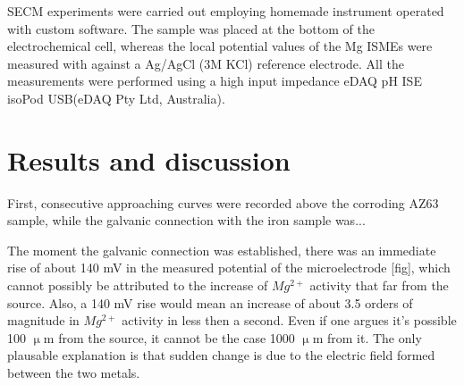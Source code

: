 \documentclass[3p]{elsarticle}
\begin{document}
SECM experiments were carried out employing homemade instrument operated with custom software. The sample was placed at the bottom of the electrochemical cell, whereas the local potential values of the Mg ISMEs were measured with against a Ag/AgCl (3M KCl) reference electrode. All the measurements were performed using a high input impedance eDAQ pH ISE isoPod USB(eDAQ Pty Ltd, Australia).

\section{Results and discussion}

First, consecutive approaching curves were recorded above the corroding AZ63 sample, while the galvanic connection with the iron sample was...

The moment the galvanic connection was established, there was an immediate rise of about 140 mV in the measured potential of the microelectrode [fig], which cannot possibly be attributed to the increase of $Mg^{2+}$ activity that far from the source. Also, a 140 mV rise would mean an increase of about 3.5 orders of magnitude in $Mg^{2+}$ activity in less then a second. Even if one argues it's possible 100 $\upmu$m from the source, it cannot be the case 1000 $\upmu$m from it. The only plausable explanation is that sudden change is due to the electric field formed between the two metals. 
\end{document}
